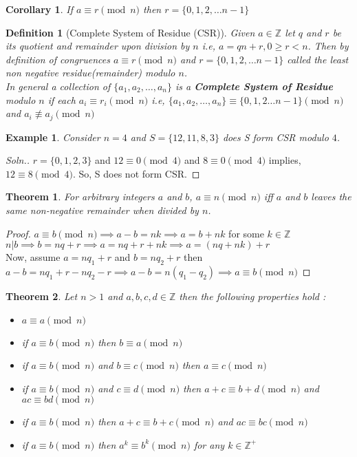\documentclass[12pt,a4paper]{article}
\newcommand{\Z}{\mathbb{Z}}
\newtheorem{thm}{Theorem}
\newtheorem{defn}{Definition}
\newtheorem{cor}{Corollary}
\newtheorem{ex}{Example}
\begin{document}
\begin{cor}
	If $a \equiv r \pmod n$ then $r = \{0,1,2,\dots n-1\}$
\end{cor}

\begin{defn}[Complete System of Residue (CSR)]
	Given $a \in \Z$ let $q$ and $r$ be its quotient and remainder upon division by $n$ i.e, $a = qn+r, 0 \ge r < n$. Then by definition of congruences $a \equiv r \pmod n$ and $r = \{0,1,2,\dots n-1\}$ called the least non negative residue(remainder) modulo $n$. \\
	In general a collection of $\{a_{1}, a_{2}, \dots, a_{n}\}$ is a \textbf{Complete System of Residue} modulo $n$ if each $a_{i} \equiv r_{i} \pmod n$ i.e, $\{a_{1}, a_{2}, \dots, a_{n}\} \equiv \{0,1,2 \dots n-1\} \pmod n$ and $a_{i} \not \equiv a_{j} \pmod n$
\end{defn}

\begin{ex}
	Consider $n=4$ and $S = \{12,11,8,3\}$ does S form CSR modulo $4$.
\end{ex}
\begin{proof}[Soln.]
	$r = \{0,1,2,3\}$ and $12 \equiv 0 \pmod 4$ and $8 \equiv 0 \pmod 4$ implies, $12 \equiv 8 \pmod 4$. So, S does not form CSR.
\end{proof}

\begin{thm}
	For arbitrary integers $a$ and $b$, $a \equiv n \pmod n$ iff $a$ and $b$ leaves the same non-negative remainder when divided by $n$. 
\end{thm}
\begin{proof}
	$ a \equiv b \pmod n \implies a - b = nk \implies a = b + nk$ for some $k \in \Z$\\
	$n|b \implies b = nq + r \implies a = nq+r+nk \implies a = (nq+nk)+r$\\
	Now, assume $a=nq_{1}+r$ and $b=nq_{2}+r$ then $a-b=nq_{1}+r - nq_{2}-r \implies a-b = n(q_{1}-q_{2}) \implies a\equiv b \pmod n$
\end{proof}

\begin{thm}
	Let $n>1$ and $a,b,c,d \in \Z$ then the following properties hold :
	\begin{itemize}
		\item $a \equiv a \pmod n$
		\item if  $a \equiv b \pmod n$ then  $b \equiv a \pmod n$
		\item if  $a \equiv b \pmod n$ and  $b \equiv c \pmod n$ then  $a \equiv c \pmod n$
		\item if  $a \equiv b \pmod n$ and  $c \equiv d \pmod n$ then  $a+c \equiv b+d \pmod n$ and  $ac \equiv bd \pmod n$
		\item  if $a \equiv b \pmod n$ then  $a+c \equiv b+c \pmod n$ and  $ac \equiv bc \pmod n$
		\item if  $a \equiv b \pmod n$ then  $a^{k} \equiv b^{k} \pmod n$ for any $k \in \Z^{+}$
	\end{itemize}
	
\end{thm}
\end{document}
